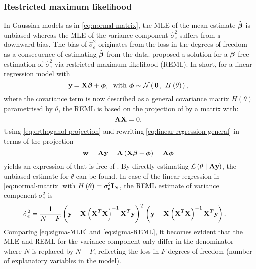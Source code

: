 \subsubsection{Restricted maximum likelihood}
\label{subsubsection:REML}
In Gaussian models as in \cref{eq:normal-matrix}, the MLE of the mean estimate \(\hat{\boldsymbol{\mathbf{\beta}}}\) is unbiased  whereas the MLE of the variance component \(\hat{\sigma}^2_e \) suffers from a downward bias. The bias of \(\hat{\sigma}^2_e \) originates from the loss in the degrees of freedom as a consequence of estimating \(\hat{\boldsymbol{\mathbf{\beta}}}\) from the data.  proposed a solution for a \(\boldsymbol{\mathbf{\beta}}\)-free estimation of \(\hat{\sigma}^2_e \) via restricted maximum likelihood (REML). In short, for a linear regression model with 
\begin{equation}
\boldsymbol{\mathbf{y}} = \boldsymbol{\mathbf{X}}\boldsymbol{\mathbf{\beta}} + \boldsymbol{\mathbf{\phi}}, \,\,\,\, \text{with }  \boldsymbol{\mathbf{\phi}} \sim  \mathcal{N}\left(\,{\boldsymbol{\mathbf{0}}}\,,~{H\left(\theta\right)}\,\right),
\label{eq:linear-regression-general}
\end{equation}
%
where the covariance term is now described as a general covariance matrix \(H\left(\theta\right)\) parametrised by \(\theta\), the REML  is based on the projection  of  by a matrix  with:
\begin{equation}
\label{eq:orthoganol-projection}
\boldsymbol{\mathbf{A}}\boldsymbol{\mathbf{X}}=0.
\end{equation}
%
Using \cref{eq:orthoganol-projection} and rewriting \cref{eq:linear-regression-general} in terms of the projection 
\begin{equation}
\boldsymbol{\mathbf{w}} = \boldsymbol{\mathbf{A}}\boldsymbol{\mathbf{y}} = \boldsymbol{\mathbf{A}}\left(\boldsymbol{\mathbf{X}}\boldsymbol{\mathbf{\beta}} + \boldsymbol{\mathbf{\phi}}\right) = \boldsymbol{\mathbf{A}}\boldsymbol{\mathbf{\phi}} 
\end{equation}
%
yields an expression of  that is free of \tmat{\beta}. By directly estimating \(\mathcal{L} \left(\theta \mid \boldsymbol{\mathbf{A}}\boldsymbol{\mathbf{y}}\right)\), the unbiased estimate for \(\theta\) can be found. In case of the linear regression in \cref{eq:normal-matrix} with \(H\left(\theta\right) = \sigma^2_e \boldsymbol{\mathbf{I}}_{N}\), the REML estimate of variance compenent \(\sigma^2_e\) is
\begin{align}
\hat{\sigma}^2_e &= \frac{1}{N-F}\left(\boldsymbol{\mathbf{y}} -\boldsymbol{\mathbf{X}}\left(\boldsymbol{\mathbf{X}}^T\boldsymbol{\mathbf{X}}\right)^{-1}\boldsymbol{\mathbf{X}}^T\boldsymbol{\mathbf{y}}\right)^T\left(\boldsymbol{\mathbf{y}} -\boldsymbol{\mathbf{X}}\left(\boldsymbol{\mathbf{X}}^T\boldsymbol{\mathbf{X}}\right)^{-1}\boldsymbol{\mathbf{X}}^T\boldsymbol{\mathbf{y}}\right).
\label{eq:sigma-REML}
\end{align}
%
Comparing \cref{eq:sigma-MLE} and \cref{eq:sigma-REML}, it becomes evident that the MLE and REML for the variance component only differ in the denominator where \(N\) is replaced by \(N-F\), reflecting the loss in \(F\) degrees of freedom (number of explanatory variables in the model). 


